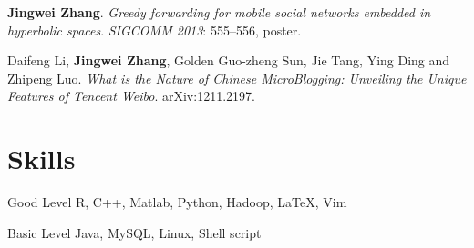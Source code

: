 \documentclass{tccv}
\begin{document}
\textbf{Jingwei Zhang}.
\emph{Greedy forwarding for mobile social networks embedded in hyperbolic spaces}.
\emph{SIGCOMM 2013}: 555--556, poster.\medskip

Daifeng Li, \textbf{Jingwei Zhang}, Golden Guo-zheng Sun, Jie Tang, Ying
Ding and Zhipeng Luo.
\emph{What is the Nature of Chinese MicroBlogging: Unveiling the Unique Features of Tencent Weibo}.
arXiv:1211.2197.\medskip

\section{Skills}

\begin{factlist}

\item{Good Level}
      {R, C++, Matlab, Python, Hadoop, \LaTeX, Vim}

\item{Basic Level}
      {Java, MySQL, Linux, Shell script}

\end{factlist}
\end{document}
